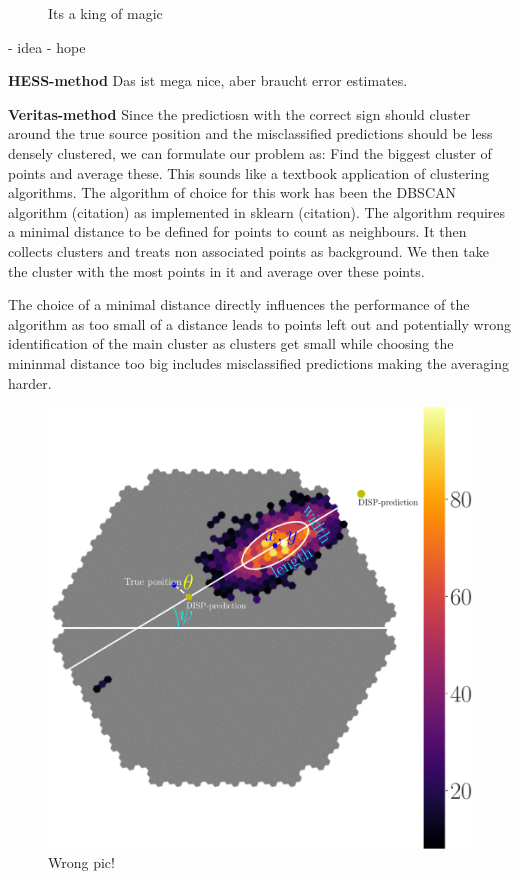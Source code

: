 \begin{figure}
\begin{subfigure}{0.3\textwidth}
    \end{subfigure}
    \caption{Its a king of magic}
    \label{fig:disp_cta_magic}
\end{figure}

- idea
- hope


\textbf{HESS-method}
Das ist mega nice, aber braucht error estimates.

\textbf{Veritas-method}
Since the predictiosn with the correct sign should cluster around the true source
position and the misclassified predictions should be less densely clustered, we 
can formulate our problem as: Find the biggest cluster of points and average these.
This sounds like a textbook application of clustering algorithms.
The algorithm of choice for this work has been the DBSCAN algorithm (citation)
as implemented in sklearn (citation). The algorithm requires a minimal distance to 
be defined for points to count as neighbours. It then collects clusters and 
treats non associated points as background. We then take the cluster with the most 
points in it and average over these points.

The choice of a minimal distance directly influences the performance 
of the algorithm as too small of a distance leads to points left out and potentially 
wrong identification of the main cluster as clusters get small while 
choosing the mininmal distance too big includes misclassified predictions 
making the averaging harder.

\begin{figure}
    \includegraphics[width=0.9\linewidth]{../Plots/hillas_complete.pdf}
    \caption{Wrong pic!}
    \label{fig:disp_amb}
\end{figure}



